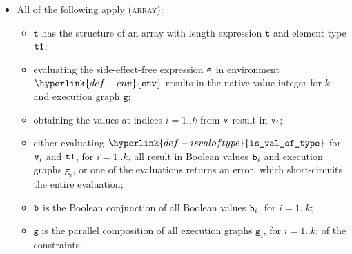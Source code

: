 \documentclass{book}
\newcommand\isvaloftype[0]{\hyperlink{def-isvaloftype}{\texttt{is\_val\_of\_type}}}
\newcommand\env[0]{\hyperlink{def-env}{\texttt{env}}}
\newcommand\vg[0]{\texttt{g}}
\newcommand\vt[0]{\texttt{t}}
\begin{document}
\begin{itemize}
  \item All of the following apply (\textsc{array}):
  \begin{itemize}
    \item $\vt$ has the structure of an array with length expression $\vt$
    and element type $\texttt{t1}$;
    \item evaluating the side-effect-free expression $\texttt{e}$ in environment $\env$
    results in the native value integer for $k$ and execution graph $\vg$;
    \item obtaining the values at indices $i=1..k$ from $\texttt{v}$ result in $\texttt{v}_i$;
    \item either evaluating $\isvaloftype$ for $\texttt{v}_i$ and $\texttt{t1}$, for $i=1..k$,
    all result in Boolean values $\texttt{b}_i$ and execution graphs $\vg_i$,
    or one of the evaluations returns an error,
    which short-circuits the entire evaluation;
    \item $\texttt{b}$ is the Boolean conjunction of all Boolean values $\texttt{b}_i$, for $i=1..k$;
    \item $\vg$ is the parallel composition of all execution graphs $\vg_i$, for $i=1..k$;
    of the constraints.
  \end{itemize}
\end{itemize}

%
\end{document}
